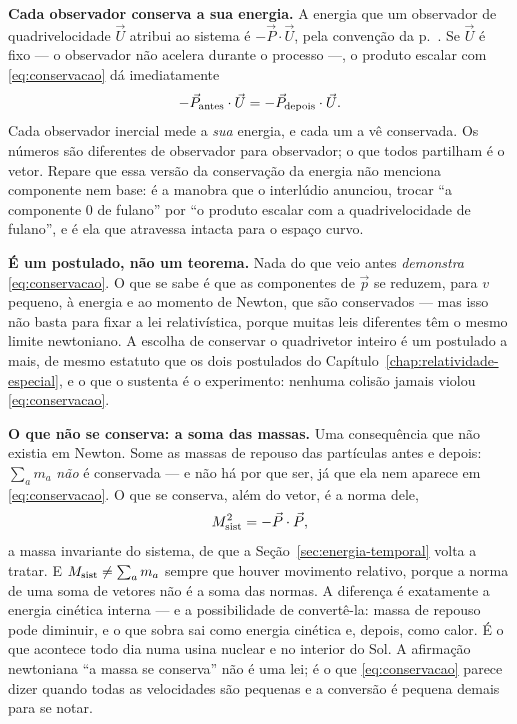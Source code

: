 \documentclass[12pt,a4paper,oneside]{book}
\theoremstyle{rgplain}
\theoremstyle{rgremark}
\begin{document}
\textbf{Cada observador conserva a sua energia.} A energia que um observador
de quadrivelocidade $\vec U$ atribui ao sistema é $-\vec P\cdot\vec U$, pela
convenção da p.~\pageref{sec:convencoes}. Se $\vec U$ é fixo --- o observador
não acelera durante o processo ---, o produto escalar com \eqref{eq:conservacao}
dá imediatamente
\[
  -\vec P_{\rm antes}\cdot\vec U=-\vec P_{\rm depois}\cdot\vec U .
\]
Cada observador inercial mede a \emph{sua} energia, e cada um a vê conservada.
Os números são diferentes de observador para observador; o que todos partilham
é o vetor. Repare que essa versão da conservação da energia não menciona
componente nem base: é a manobra que o interlúdio anunciou, trocar ``a
componente $0$ de fulano'' por ``o produto escalar com a quadrivelocidade de
fulano'', e é ela que atravessa intacta para o espaço curvo.

\textbf{É um postulado, não um teorema.} Nada do que veio antes \emph{demonstra}
\eqref{eq:conservacao}. O que se sabe é que as componentes de $\vec p$ se
reduzem, para $v$ pequeno, à energia e ao momento de Newton, que são
conservados --- mas isso não basta para fixar a lei relativística, porque
muitas leis diferentes têm o mesmo limite newtoniano. A escolha de conservar o
quadrivetor inteiro é um postulado a mais, de mesmo estatuto que os dois
postulados do Capítulo~\ref{chap:relatividade-especial}, e o que o sustenta é
o experimento: nenhuma colisão jamais violou \eqref{eq:conservacao}.

\textbf{O que não se conserva: a soma das massas.} Uma consequência que não
existia em Newton. Some as massas de repouso das partículas antes e depois:
$\sum_a m_a$ \emph{não} é conservada --- e não há por que ser, já que ela nem
aparece em \eqref{eq:conservacao}. O que se conserva, além do vetor, é a norma
dele,
\begin{equation}
  M_{\rm sist}^2=-\vec P\cdot\vec P ,
  \label{eq:massa-sistema}
\end{equation}
a massa invariante do sistema, de que a Seção~\ref{sec:energia-temporal}
volta a tratar. E $M_{\rm sist}\neq\sum_a m_a$ sempre que houver movimento
relativo, porque a norma de uma soma de vetores não é a soma das normas. A
diferença é exatamente a energia cinética interna --- e a possibilidade de
convertê-la: massa de repouso pode diminuir, e o que sobra sai como energia
cinética e, depois, como calor. É o que acontece todo dia numa usina nuclear e
no interior do Sol. A afirmação newtoniana ``a massa se conserva'' não é uma
lei; é o que \eqref{eq:conservacao} parece dizer quando todas as velocidades
são pequenas e a conversão é pequena demais para se notar.
\end{document}
